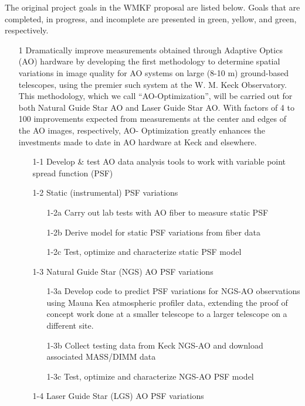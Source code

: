 The original project goals in the WMKF proposal are listed below. Goals that are completed, in progress, and incomplete are presented in green, yellow, and green, respectively.

\begin{itemize}
\item[1] Dramatically improve measurements obtained through Adaptive Optics (AO) hardware by developing the first methodology to determine spatial variations in image quality for AO systems on large (8-10 m) ground-based telescopes, using the premier such system at the W. M. Keck Observatory. This methodology, which we call “AO-Optimization”, will be carried out for both Natural Guide Star AO and Laser Guide Star AO. With factors of 4 to 100 improvements expected from measurements at the center and edges of the AO images, respectively, AO- Optimization greatly enhances the investments made to date in AO hardware at Keck and elsewhere.
    \begin{itemize}
    \item[1-1] Develop \& test AO data analysis tools to work with variable point spread function (PSF)
    \item[1-2] Static (instrumental) PSF variations
        \begin{itemize}
        \item[1-2a] Carry out lab tests with AO fiber to measure static PSF
        \item[1-2b] Derive model for static PSF variations from fiber data 
        \item[1-2c] Test, optimize and characterize static PSF model
        \end{itemize}
    \item[1-3] Natural Guide Star (NGS) AO PSF variations
        \begin{itemize}
        \item[1-3a] Develop code to predict PSF variations for NGS-AO observations
            using Mauna Kea atmospheric profiler data, extending the proof of concept 
            work done at a smaller telescope to a larger telescope on a different site.
        \item[1-3b] Collect testing data from Keck NGS-AO and download associated MASS/DIMM data
        \item[1-3c] Test, optimize and characterize NGS-AO PSF model
        \end{itemize}
    \item[1-4] Laser Guide Star (LGS) AO PSF variations

\end{itemize}
\end{itemize}
